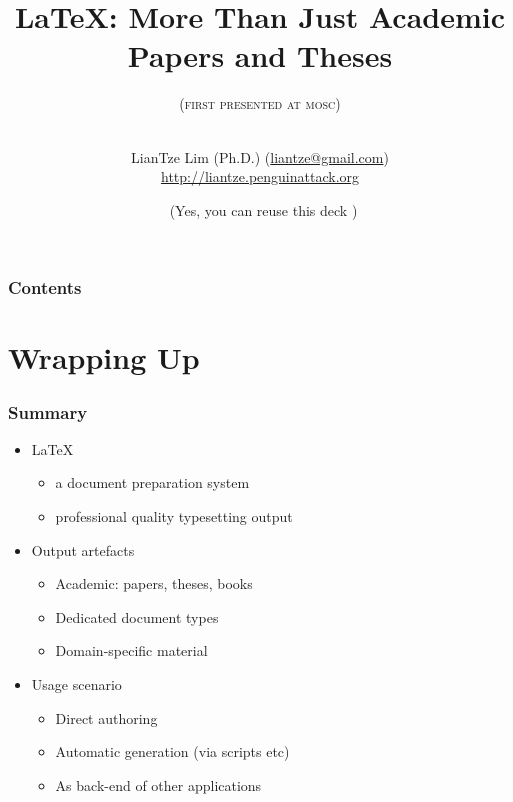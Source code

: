 \documentclass[xcolor={x11names,svgnames,dvipsnames},trans]{beamer}
\author[LianTze Lim (Ph.D.)]{\texorpdfstring{LianTze Lim (Ph.D.)
(\url{liantze@gmail.com})\\\url{http://liantze.penguinattack.org}}{LianTze Lim (Ph.D.)}}
\title{\LaTeX: More Than Just Academic Papers and Theses}
\subtitle{\texorpdfstring{(\textsc{first presented at mosc}\oldstylenums{2011})\\%
\hrulefill\ \adforn{57}\thickspace\wb{m}\thickspace\adforn{29}\ \hrulefill}{First Presented at MOSC 2011; some modifications since}}
\date[\ccbyncsa]{\ccbyncsa\ (Yes, you can reuse this deck \Smiley)}
\begin{document}
\begin{frame}[plain]
\maketitle
\end{frame}

\begin{frame}
\frametitle{Contents}
\tableofcontents
\end{frame}






\section{Wrapping Up}

\begin{frame}
\frametitle{Summary}
\begin{itemize}
\item<+-> \LaTeX
	\begin {itemize}
	\item a document preparation system
	\item professional quality typesetting output
	\end{itemize}
\item<+-> Output artefacts
	\begin{itemize}
	\item Academic: papers, theses, books
	\item Dedicated document types
	\item Domain-specific material
	\end{itemize}
\item<+-> Usage scenario
	\begin{itemize}
	\item Direct authoring
	\item Automatic generation (via scripts etc)
	\item As back-end of other applications
	\end{itemize}
\end{itemize}
\end{frame}
\end{document}
